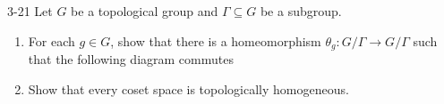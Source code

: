 \begin{problem}{3-21}
Let $G$ be a topological group and $\Gamma \subseteq G$ be a subgroup.
\begin{enumerate}[label={(\alph*)}]
	\item For each $g\in G$, show that there is a homeomorphism $\theta_{g}: G/\Gamma \to G/\Gamma$ such that the following diagram commutes
	      \begin{figure}[htp]
		      \centering
	      \end{figure}
	\item Show that every coset space is topologically homogeneous.
\end{enumerate}
\end{problem}

